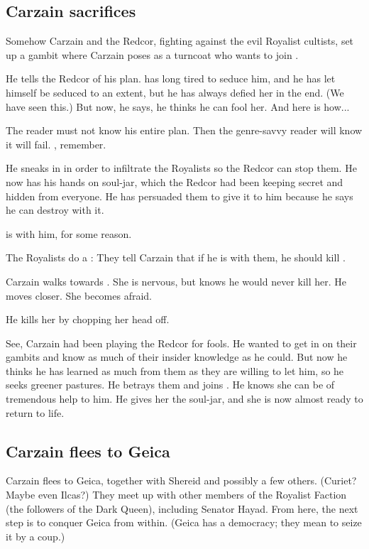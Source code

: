 \begin{garbage}
\subsection{Carzain sacrifices \Racel} 
Somehow Carzain and the Redcor, fighting against the evil Royalist cultists, set up a gambit where Carzain poses as a turncoat who wants to join \Belzir. 

He tells the Redcor of his plan. 
\Belzir{} has long tired to seduce him, and he has let himself be seduced to an extent, but he has always defied her in the end. 
(We have seen this.) 
But now, he says, he thinks he can fool her. 
And here is how... 

The reader must not know his entire plan. 
Then the genre-savvy reader will know it will fail. 
, remember. 

He sneaks in in order to infiltrate the Royalists so the Redcor can stop them. 
He now has his hands on  soul-jar, which the Redcor had been keeping secret and hidden from everyone. 
He has persuaded them to give it to him because he says he can destroy \Belzir{} with it. 

\Racel{} is with him, for some reason. 

The Royalists do a : 
They tell Carzain that if he is with them, he should kill \Racel. 

Carzain walks towards \Racel. 
She is nervous, but knows he would never kill her.
He moves closer.
She becomes afraid.

He kills her by chopping her head off. 

See, Carzain had been playing the Redcor for fools. 
He wanted to get in on their gambits and know as much of their insider knowledge as he could. 
But now he thinks he has learned as much from them as they are willing to let him, so he seeks greener pastures. 
He betrays them and joins \Belzir. 
He knows she can be of tremendous help to him.
He gives her the soul-jar, and she is now almost ready to return to life. 







\subsection{Carzain flees to Geica} 
Carzain flees to Geica, together with Shereid and possibly a few others. (Curiet? Maybe even Ilcas?) They meet up with other members of the Royalist Faction (the followers of the Dark Queen), including Senator Hayad. From here, the next step is to conquer Geica from within. (Geica has a democracy; they mean to seize it by a coup.) 


\end{garbage}
